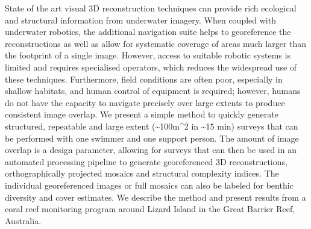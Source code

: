 State of the art visual 3D reconstruction techniques can provide rich ecological and structural information from underwater imagery. When coupled with underwater robotics, the additional navigation suite helps to georeference the reconstructions as well as allow for systematic coverage of areas much larger than the footprint of a single image. However, access to suitable robotic systems is limited and requires specialised operators, which reduces the widespread use of these techniques. Furthermore, field conditions are often poor, especially in shallow habitats, and human control of equipment is required; however, humans do not have the capacity to navigate precisely over large extents to produce consistent image overlap. We present a simple method to quickly generate structured, repeatable and large extent (\sim{100m^{2}} in \sim{15 min}) surveys that can be performed with one swimmer and one support person. The amount of image overlap is a design parameter, allowing for surveys that can then be used in an automated processing pipeline to generate georeferenced 3D reconstructions, orthographically projected mosaics and structural complexity indices. The individual georeferenced images or full mosaics can also be labeled for benthic diversity and cover estimates. We describe the method and present results from a coral reef monitoring program around Lizard Island in the Great Barrier Reef, Australia.